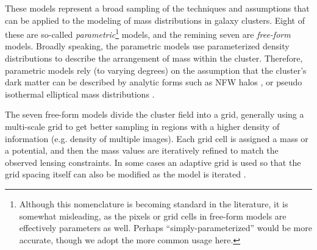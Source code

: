 These models represent a broad sampling of the
techniques and assumptions that can be applied to the modeling of mass
distributions in galaxy clusters. 
Eight of these are so-called {\it parametric}\footnote{Although this
nomenclature is becoming standard in the literature, it is somewhat
misleading, as the pixels or grid cells in free-form models are
effectively parameters as well. Perhaps ``simply-parameterized'' would
be more accurate, though we adopt the more common usage here.}
models, and the remining seven are {\it free-form} models.  
Broadly speaking, the parametric models use parameterized density
distributions to describe the arrangement of mass within the cluster.
Therefore, parametric models rely (to
varying degrees) on the assumption that the cluster's dark matter can
be described by analytic forms such as NFW halos \citep{Navarro:1997},
or pseudo isothermal elliptical mass
distributions \citep[PIEMD][]{Kassiola:1993}.

The seven free-form models divide the cluster field into a grid,
generally using a multi-scale grid to get better sampling in regions
with a higher density of information (e.g. density of multiple
images). Each grid cell is assigned a mass or a potential, and then
the mass values are iteratively refined to match the observed lensing
constraints. In some cases an adaptive grid is used so that the grid
spacing itself can also be modified as the model is
iterated \citep[e.g.][]{Liesenborgs:2006,Merten:2009,Bradac:2009}.



